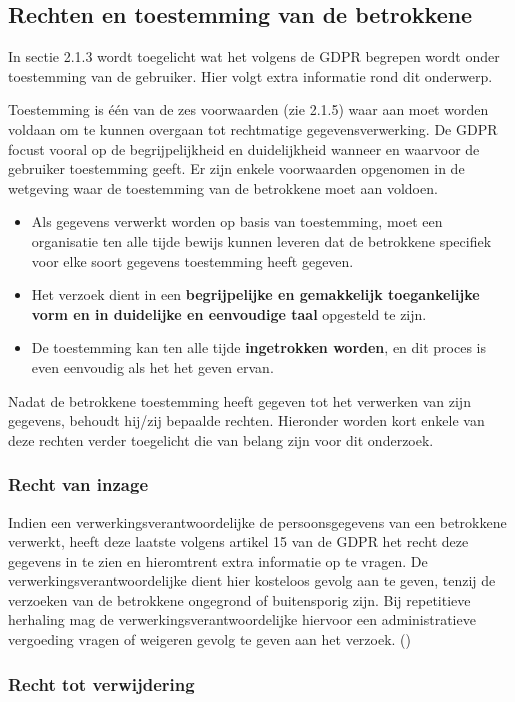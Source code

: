 \subsection{Rechten en toestemming van de betrokkene}
In sectie 2.1.3 wordt toegelicht wat het volgens de GDPR begrepen wordt onder toestemming van de gebruiker. Hier volgt extra informatie rond dit onderwerp. 

 Toestemming is één van de zes voorwaarden (zie 2.1.5) waar aan moet worden voldaan om te kunnen overgaan tot rechtmatige gegevensverwerking. De GDPR focust vooral op de begrijpelijkheid en duidelijkheid wanneer en waarvoor de gebruiker toestemming geeft. 
Er zijn enkele voorwaarden opgenomen in de wetgeving waar de toestemming van de betrokkene moet aan voldoen. 
\begin{itemize}
	\item  Als  gegevens verwerkt worden op basis van toestemming, moet een organisatie ten alle tijde bewijs kunnen leveren dat de betrokkene specifiek voor elke soort gegevens toestemming heeft gegeven. 
	\item  Het verzoek dient in een \textbf{begrijpelijke en gemakkelijk toegankelijke vorm en in duidelijke en eenvoudige taal} opgesteld te zijn. 
	\item  
	De toestemming kan ten alle tijde \textbf{ingetrokken worden}, en dit proces is even eenvoudig als het het geven ervan. 
\end{itemize}

Nadat de betrokkene toestemming heeft gegeven tot het verwerken van zijn gegevens, behoudt hij/zij bepaalde rechten. Hieronder worden kort enkele van deze rechten verder toegelicht die van belang zijn voor dit onderzoek. 

\subsubsection{Recht van inzage}
Indien een verwerkingsverantwoordelijke de persoonsgegevens van een betrokkene verwerkt, heeft deze laatste volgens artikel 15 van de GDPR het recht deze gegevens in te
zien en hieromtrent extra informatie op te vragen.
De verwerkingsverantwoordelijke dient hier kosteloos gevolg aan te geven, tenzij de
verzoeken van de betrokkene ongegrond of buitensporig zijn. Bij repetitieve herhaling
mag de verwerkingsverantwoordelijke hiervoor een administratieve vergoeding vragen of
weigeren gevolg te geven aan het verzoek. (\textcite{Commissie2016})

\subsubsection{Recht tot verwijdering}

